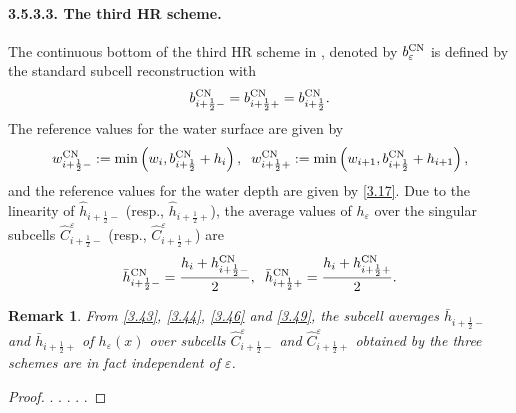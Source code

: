 \documentclass[11pt,a4paper,center,notitlepage]{article}
\numberwithin{equation}{section}
\newtheorem{remark}{Remark}
\begin{document}
\paragraph{3.5.3.3. The third HR scheme.} The continuous bottom of the third HR scheme in \cite{Chen2017}, denoted by $b_\varepsilon ^{\rm CN}$ is defined by the standard subcell reconstruction with 
\begin{align}
b_{i + \frac{1}{2} - }^{\rm CN} = b_{i + \frac{1}{2} + }^{\rm CN} = b_{i + \frac{1}{2}}^{\rm CN} .
\end{align}
The reference values for the water surface are given by
\begin{align}
w_{i + \frac{1}{2} - }^{\rm CN}: = \min \left( {{w_i},b_{i + \frac{1}{2}}^{\rm CN} + {h_i}} \right),\hspace{2mm} w_{i + \frac{1}{2} + }^{\rm CN}: = \min \left( {{w_{i + 1}},b_{i + \frac{1}{2}}^{\rm CN} + {h_{i + 1}}} \right),
\end{align}
and the reference values for the water depth are given by \eqref{3.17}. Due to the linearity of ${\widehat h_{i + \frac{1}{2} - }}$ (resp., ${\widehat h_{i + \frac{1}{2} + }}$), the average values of $h_\varepsilon$ over the singular subcells $\widehat C_{i + \frac{1}{2} - }^\varepsilon $ (resp., $\widehat C_{i + \frac{1}{2} + }^\varepsilon$) are
\begin{align}
\label{3.49}
\bar h_{i + \frac{1}{2} - }^{\rm CN} = \frac{{{h_i} + h_{i + \frac{1}{2} - }^{\rm CN}}}{2}, \hspace{2mm} \bar h_{i + \frac{1}{2} + }^{\rm CN} = \frac{{{h_i} + h_{i + \frac{1}{2} + }^{\rm CN}}}{2}.
\end{align}

\begin{remark}
From \eqref{3.43}, \eqref{3.44}, \eqref{3.46} and \eqref{3.49}, the subcell averages ${{\bar h}_{i + \frac{1}{2} - }}$ and ${{\bar h}_{i + \frac{1}{2} + }}$ of $h_\varepsilon \left(x\right)$ over subcells $\widehat C_{i + \frac{1}{2} - }^\varepsilon $ and $\widehat C_{i + \frac{1}{2} + }^\varepsilon $ obtained by the three schemes are in fact independent of $\varepsilon$.
\end{remark}

\begin{proof}
. . . . . 
\end{proof}
\end{document}
